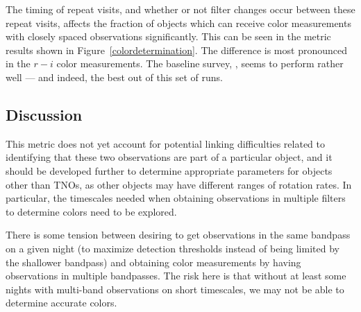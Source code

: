 The timing of repeat visits, and whether or not filter changes occur
between these repeat visits, affects the fraction of objects which can
receive color measurements with closely spaced observations
significantly. This can be seen in the metric results shown in
Figure~\ref{colordetermination}. The difference is most pronounced in
the $r-i$ color measurements. The baseline survey,
, seems to perform rather well --- and
indeed, the best out of this set of runs.



\subsection{Discussion}
\label{sec:\secname:discussion}

This metric does not yet account for potential linking difficulties
related to identifying that these two observations are part of a
particular object, and it should be developed further to determine
appropriate parameters for objects other than TNOs, as other objects
may have different ranges of rotation rates. In particular, the
timescales needed when obtaining observations in multiple filters to
determine colors need to be explored.

There is some tension between desiring to get observations in the same
bandpass on a given night (to maximize detection thresholds instead
of being limited by the shallower bandpass) and obtaining color
measurements by having observations in multiple bandpasses. The risk
here is that without at least some nights with multi-band observations
on short timescales, we may not be able to determine accurate colors.

